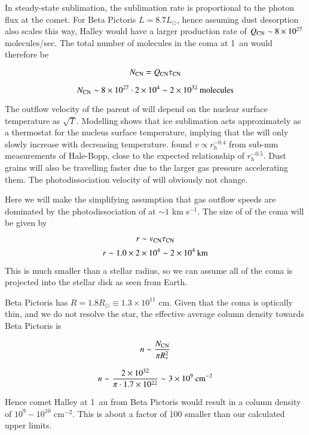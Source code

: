 \documentclass{aa}
\newcommand{\kms}{km s$^{-1}$}
\newcommand{\bp}{Beta Pictoris}
\begin{document}
In steady-state sublimation, the sublimation rate is proportional to the photon flux at the comet. For \bp{} $L=8.7L_\odot$, hence assuming dust desorption also scales this way, Halley would have a larger  production rate of $Q_{\ce{CN}}\sim 8\times10^{27}$ molecules/sec.
%
The total number of  molecules in the coma at 1~au would therefore be

$$N_{\ce{CN}}=Q_{\ce{CN}} \tau_{\ce{CN}}$$

$$N_{\ce{CN}}\sim 8\times10^{27} \cdot  2\times10^4 \sim 2\times10^{32}\:{\rm molecules}$$


The outflow velocity of the parent of  will depend on the nuclear surface temperature as $\sqrt{T}$.
%
Modelling shows that ice sublimation acts approximately as a thermostat for the nucleus surface temperature, implying that the  will only slowly increase with decreasing temperature.
%
\citet{Biver99} found $v\propto r_h^{-0.4}$ from sub-mm measurements of Hale-Bopp, close to the expected relationship of $r_h^{-0.5}$.
%
Dust grains will also be travelling faster due to the larger gas pressure accelerating them.
%
The photodissociation velocity of  will obviously not change. 

Here we will make the simplifying assumption that gas outflow speeds are dominated by the photodissociation of  at $\sim 1$ \kms{}.
%
The size of of the  coma will be given by

$$r\sim v_{\ce{CN}} \tau_{\ce{CN}}$$
$$r\sim 1.0 \times 2\times 10^{4}\sim 2\times 10^{4}\:{\rm km}$$

This is much smaller than a stellar radius, so we can assume all of the coma is projected into the stellar disk as seen from Earth.

\bp{} has $R=1.8R_\odot\equiv 1.3\times 10^{11}$ cm.
%
Given that the coma is optically thin, and we do not resolve the star, the effective average column density towards \bp{} is 

$$n\sim\frac{N_{\ce{CN}}}{\pi R_*^2}$$

$$n\sim\frac{2\times10^{32}}{\pi\cdot 1.7\times10^{22}}\sim 3\times10^{9}\:{\rm cm^{-2}}$$

Hence comet Halley at 1~au from \bp{} would result in a  column density of $10^{9}-10^{10}$ cm$^{-2}$.
%
This is about a factor of 100 smaller than our calculated upper limits.
\end{document}
